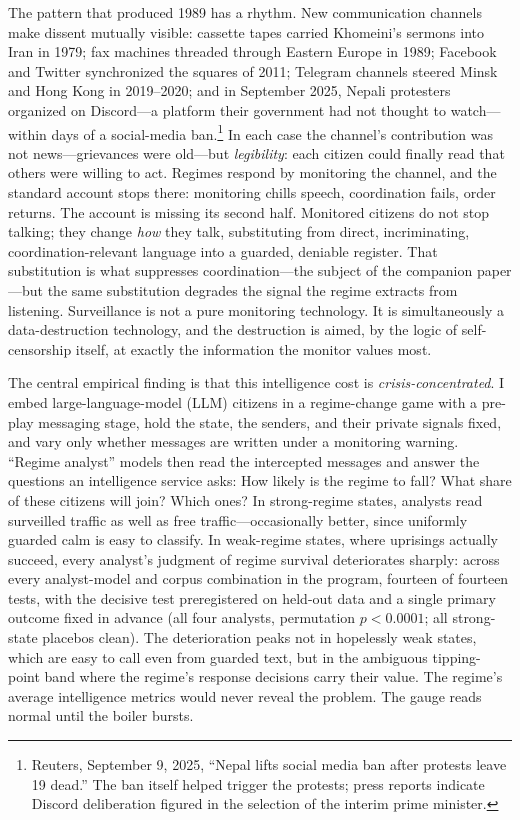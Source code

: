 \documentclass[11pt]{article}
\theoremstyle{remark}
\begin{document}
The pattern that produced 1989 has a rhythm. New communication channels make dissent mutually visible: cassette tapes carried Khomeini's sermons into Iran in 1979; fax machines threaded through Eastern Europe in 1989; Facebook and Twitter synchronized the squares of 2011; Telegram channels steered Minsk and Hong Kong in 2019--2020; and in September 2025, Nepali protesters organized on Discord---a platform their government had not thought to watch---within days of a social-media ban.\footnote{Reuters, September 9, 2025, ``Nepal lifts social media ban after protests leave 19 dead.'' The ban itself helped trigger the protests; press reports indicate Discord deliberation figured in the selection of the interim prime minister.} In each case the channel's contribution was not news---grievances were old---but \emph{legibility}: each citizen could finally read that others were willing to act. Regimes respond by monitoring the channel, and the standard account stops there: monitoring chills speech, coordination fails, order returns. The account is missing its second half. Monitored citizens do not stop talking; they change \emph{how} they talk, substituting from direct, incriminating, coordination-relevant language into a guarded, deniable register. That substitution is what suppresses coordination---the subject of the companion paper \citep{eltokhy2026speaking}---but the same substitution degrades the signal the regime extracts from listening. Surveillance is not a pure monitoring technology. It is simultaneously a data-destruction technology, and the destruction is aimed, by the logic of self-censorship itself, at exactly the information the monitor values most.

The central empirical finding is that this intelligence cost is \emph{crisis-concentrated}. I embed large-language-model (LLM) citizens in a \citet{morris2003} regime-change game with a pre-play messaging stage, hold the state, the senders, and their private signals fixed, and vary only whether messages are written under a monitoring warning. ``Regime analyst'' models then read the intercepted messages and answer the questions an intelligence service asks: How likely is the regime to fall? What share of these citizens will join? Which ones? In strong-regime states, analysts read surveilled traffic as well as free traffic---occasionally better, since uniformly guarded calm is easy to classify. In weak-regime states, where uprisings actually succeed, every analyst's judgment of regime survival deteriorates sharply: across every analyst-model and corpus combination in the program, fourteen of fourteen tests, with the decisive test preregistered on held-out data and a single primary outcome fixed in advance (all four analysts, permutation $p<0.0001$; all strong-state placebos clean). The deterioration peaks not in hopelessly weak states, which are easy to call even from guarded text, but in the ambiguous tipping-point band where the regime's response decisions carry their value. The regime's average intelligence metrics would never reveal the problem. The gauge reads normal until the boiler bursts.
\end{document}
